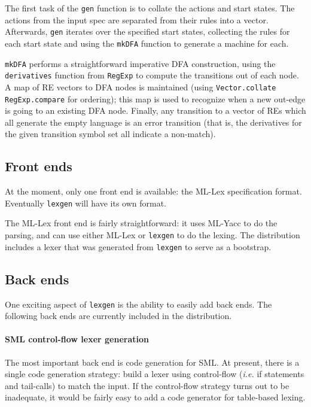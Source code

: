 \documentclass[11pt]{article}
\newcommand{\flex}{\texttt{lexgen}}
\newcommand{\ie}{{\em i.e.}}
\newcommand{\nm}[1]{\texttt{#1}}
\begin{document}
The first task of the \nm{gen} function is to collate the actions and start
states.  The actions from the input spec are separated from their rules into a
vector.  Afterwards, \nm{gen} iterates over the specified start states,
collecting the rules for each start state and using the \nm{mkDFA} function to
generate a machine for each.

\nm{mkDFA} performs a straightforward imperative DFA construction, using
the \nm{derivatives} function from \nm{RegExp} to compute the transitions out of
each node. A map of RE vectors to DFA nodes is maintained (using
\nm{Vector.collate RegExp.compare} for ordering); this map is used to recognize
when a new out-edge is going to an existing DFA node.  Finally, any transition
to a vector of REs which all generate the empty language is an error transition
(that is, the derivatives for the given transition symbol set all indicate a
non-match).

\subsection{Front ends}

At the moment, only one front end is available: the ML-Lex specification
format.  Eventually \flex{} will have its own format.

The ML-Lex front end is fairly straightforward: it uses ML-Yacc to do the
parsing, and can use either ML-Lex or \flex{} to do the lexing.  The
distribution includes a lexer that was generated from \flex{} to serve as a
bootstrap.

\subsection{Back ends}

One exciting aspect of \flex{} is the ability to easily add back ends.  The
following back ends are currently included in the distribution.

\paragraph{SML control-flow lexer generation}

The most important back end is code generation for SML.  At present, there is a
single code generation strategy: build a lexer using control-flow (\ie
if statements and tail-calls) to match the input.  If the control-flow strategy
turns out to be inadequate, it would be fairly easy to add a code
generator for table-based lexing.
\end{document}
